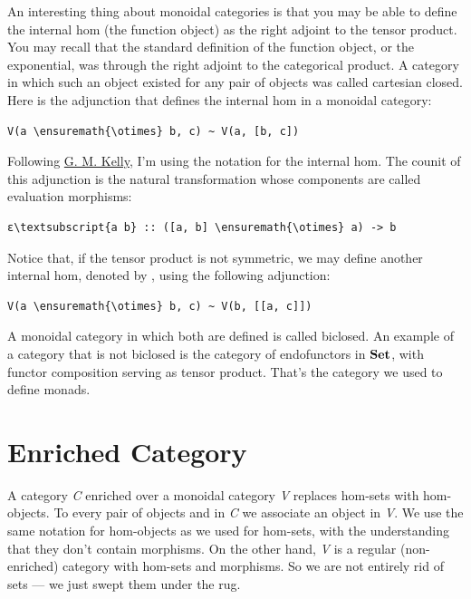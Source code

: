 An interesting thing about monoidal categories is that you may be able
to define the internal hom (the function object) as the right adjoint to
the tensor product. You may recall that the standard definition of the
function object, or the exponential, was through the right adjoint to
the categorical product. A category in which such an object existed for
any pair of objects was called cartesian closed. Here is the adjunction
that defines the internal hom in a monoidal category:

\begin{Verbatim}[commandchars=\\\{\}]
V(a \ensuremath{\otimes} b, c) ~ V(a, [b, c])
\end{Verbatim}
Following
\href{http://www.tac.mta.ca/tac/reprints/articles/10/tr10.pdf}{G. M.
Kelly}, I'm using the notation \code{{[}b, c{]}} for the internal
hom. The counit of this adjunction is the natural transformation whose
components are called evaluation morphisms:

\begin{Verbatim}[commandchars=\\\{\}]
ε\textsubscript{a b} :: ([a, b] \ensuremath{\otimes} a) -> b
\end{Verbatim}
Notice that, if the tensor product is not symmetric, we may define
another internal hom, denoted by \code{{[}{[}a, c{]}{]}}, using the
following adjunction:

\begin{Verbatim}[commandchars=\\\{\}]
V(a \ensuremath{\otimes} b, c) ~ V(b, [[a, c]])
\end{Verbatim}
A monoidal category in which both are defined is called biclosed. An
example of a category that is not biclosed is the category of
endofunctors in $\mathbf{Set}$, with functor composition serving as tensor
product. That's the category we used to define monads.

\section{Enriched Category}\label{enriched-category}

A category \emph{C} enriched over a monoidal category \emph{V} replaces
hom-sets with hom-objects. To every pair of objects  and
 in \emph{C} we associate an object  in
\emph{V}. We use the same notation for hom-objects as we used for
hom-sets, with the understanding that they don't contain morphisms. On
the other hand, \emph{V} is a regular (non-enriched) category with
hom-sets and morphisms. So we are not entirely rid of sets --- we just
swept them under the rug.

